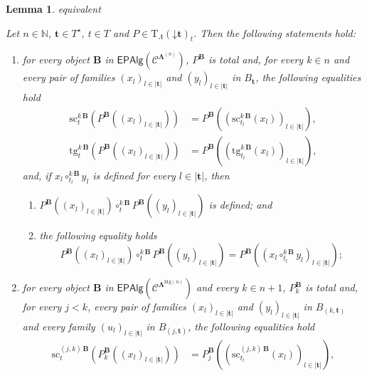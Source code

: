 \documentclass[a4paper, reqno]{amsbook}
\makeatletter
\newcommand{\bb}[1]{\ensuremath{\lvert #1 \rvert}}
\newcommand{\vs}[1]{\mathbin{\downarrow}#1}
\newcommand{\sig}[1]{\mathbf{#1}}             %
\newcommand{\spec}[1]{\boldsymbol{\mathcal{#1}}} %
\newcommand{\htg}{\mathrm{htg}}                %
\newcommand{\src}{\mathrm{sc}}
\newcommand{\tgt}{\mathrm{tg}}
\theoremstyle{plain}
\newtheorem{lemma}[theorem]{Lemma}
\theoremstyle{definition}
\newcommand*{\CA@leanpending}{}
\newcommand*{\CA@leanrelation}{}
\newcommand*{\lean}[2]{%
  \ifcsname\string\color@lean@#1\endcsname\else
    \PackageError{main}{Unknown relation `#1' in \string\lean}{Use equivalent, weaker or stronger.}%
  \fi
  \gdef\CA@leanrelation{#1}%
  \gdef\CA@leanpending{#2}}
\makeatother
\begin{document}
\begin{lemma}\label{LTermOpCatAlg}\lean{equivalent}{Homogeneous.CategorialAlgebra.termFunctor,Heterogeneous.CategorialAlgebra.termFunctor}
Let $n\in\mathbb{N}$, $\mathbf{t}\in T^{\star}$, $t\in T$ and $P\in\mathrm{T}_{\Lambda}(\vs{\mathbf{t}})_{t}$.
Then the following statements hold:
\begin{enumerate}
\item for every object $\mathbf{B}$ in $\mathsf{EPAlg}(\spec{C}^{\sig{\Lambda}^{(n)}})$, $P^{\mathbf{B}}$ is total and, for every $k\in n$ and every pair of families $(x_{l})_{l\in\bb{\mathbf{t}}}$ and $(y_{l})_{l\in\bb{\mathbf{t}}}$ in $B_{\mathbf{t}}$, the following equalities hold
\begin{align*}
\src^{k\,\mathbf{B}}_{t}\left(P^{\mathbf{B}}\left((x_{l})_{l\in\bb{\mathbf{t}}}\right)\right)&=P^{\mathbf{B}}\left(\left(\src^{k\,\mathbf{B}}_{t_{l}}(x_{l})\right)_{l\in\bb{\mathbf{t}}}\right),
\\
\tgt^{k\,\mathbf{B}}_{t}\left(P^{\mathbf{B}}\left((x_{l})_{l\in\bb{\mathbf{t}}}\right)\right)&=P^{\mathbf{B}}\left(\left(\tgt^{k\,\mathbf{B}}_{t_{l}}(x_{l})\right)_{l\in\bb{\mathbf{t}}}\right),
\end{align*}
and, if $x_{l}\circ^{k\,\mathbf{B}}_{t_{l}}y_{l}$ is defined for every $l\in\bb{\mathbf{t}}$, then
\begin{enumerate}
\item $P^{\mathbf{B}}((x_{l})_{l\in\bb{\mathbf{t}}})\circ^{k\,\mathbf{B}}_{t}P^{\mathbf{B}}((y_{l})_{l\in\bb{\mathbf{t}}})$ is defined; and
\item the following equality holds
$$
P^{\mathbf{B}}\left((x_{l})_{l\in\bb{\mathbf{t}}}\right)\circ^{k\,\mathbf{B}}_{t}P^{\mathbf{B}}\left((y_{l})_{l\in\bb{\mathbf{t}}}\right)=P^{\mathbf{B}}\left(\left(x_{l}\circ^{k\,\mathbf{B}}_{t_{l}}y_{l}\right)_{l\in\bb{\mathbf{t}}}\right);
$$
\end{enumerate}
\item for every object $\mathbf{B}$ in $\mathsf{EPAlg}(\spec{C}^{\sig{\Lambda}^{\htg(n)}})$ and every $k\in n+1$, $P_{k}^{\mathbf{B}}$ is total and, for every $j<k$, every pair of families $(x_{l})_{l\in\bb{\mathbf{t}}}$ and $(y_{l})_{l\in\bb{\mathbf{t}}}$ in $B_{(k,\mathbf{t})}$ and every family $(u_{l})_{l\in\bb{\mathbf{t}}}$ in $B_{(j,\mathbf{t})}$, the following equalities hold
\begin{align*}
\src^{(j,k)\,\mathbf{B}}_{t}\left(P_{k}^{\mathbf{B}}\left((x_{l})_{l\in\bb{\mathbf{t}}}\right)\right)&=P_{j}^{\mathbf{B}}\left(\left(\src^{(j,k)\,\mathbf{B}}_{t_{l}}(x_{l})\right)_{l\in\bb{\mathbf{t}}}\right),

\end{align*}
\end{enumerate}
\end{lemma}
\end{document}

